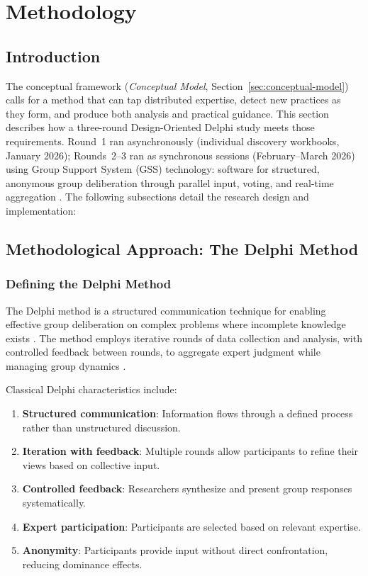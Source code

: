 \section{Methodology}\label{sec:methodology}

\subsection*{Introduction}

The conceptual framework (\textit{Conceptual Model}, Section~\ref{sec:conceptual-model}) calls for a
method that can tap distributed expertise, detect new practices as they form,
and produce both analysis and practical guidance. This section describes how a
three-round Design-Oriented Delphi study meets those requirements. Round~1 ran
asynchronously (individual discovery workbooks, January 2026); Rounds~2--3 ran
as synchronous sessions (February--March 2026) using Group Support System (GSS)
technology: software for structured, anonymous group deliberation through
parallel input, voting, and real-time aggregation
\parencite{klein_use_2007, bobbert_group_2013, bobbert_exploring_2017}. The following subsections detail the
research design and implementation:

\localtableofcontents\clearpage

\subsection{Methodological Approach: The Delphi Method}

\subsubsection{Defining the Delphi Method}

The Delphi method is a structured communication technique for enabling
effective group deliberation on complex problems where incomplete knowledge
exists \parencite{linstone_delphi_1975}. The method employs iterative rounds of
data collection and analysis, with controlled feedback between rounds, to
aggregate expert judgment while managing group dynamics
\parencite{dalkey_experimental_1963}.

Classical Delphi characteristics include:

\begin{enumerate}
    \item \textbf{Structured communication}: Information flows through a defined process rather than unstructured discussion.
    \item \textbf{Iteration with feedback}: Multiple rounds allow participants to refine their views based on collective input.
    \item \textbf{Controlled feedback}: Researchers synthesize and present group responses systematically.
    \item \textbf{Expert participation}: Participants are selected based on relevant expertise.
    \item \textbf{Anonymity}: Participants provide input without direct confrontation, reducing dominance effects.
\end{enumerate}

